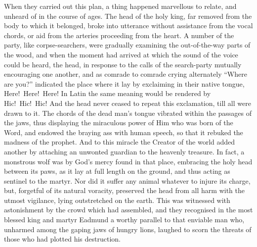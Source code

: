\documentclass[10pt]{book}
\begin{document}
\begin{paracol}{2}
When they carried out this plan, a thing happened marvellous to relate, and unheard of in the course of ages. The head of the holy king, far removed from the body to which it belonged, broke into utterance without assistance from the vocal chords, or aid from the arteries proceeding from the heart. A number of the party, like corpse-searchers, were gradually examining the out-of-the-way parts of the wood, and when the moment had arrived at which the sound of the voice could be heard, the head, in response to the calls of the search-party mutually encouraging one another, and as comrade to comrade crying alternately ``Where are you?'' indicated the place where it lay by exclaiming in their native tongue, Here!\ Here!\ Here! In Latin the same meaning would be rendered by Hic!\ Hic!\ Hic! And the head never ceased to repeat this exclamation, till all were drawn to it. The chords of the dead man's tongue vibrated within the passages of the jaws, thus displaying the miraculous power of Him who was born of the Word, and endowed the braying ass with human speech, so that it rebuked the madness of the prophet. And to this miracle the Creator of the world added another by attaching an unwonted guardian to the heavenly treasure. In fact, a monstrous wolf was by God's mercy found in that place, embracing the holy head between its paws, as it lay at full length on the ground, and thus acting as sentinel to the martyr. Nor did it suffer any animal whatever to injure its charge, but, forgetful of its natural voracity, preserved the head from all harm with the utmost vigilance, lying outstretched on the earth. This was witnessed with astonishment by the crowd which had assembled, and they recognised in the most blessed king and martyr Eadmund a worthy parallel to that enviable man who, unharmed among the gaping jaws of hungry lions, laughed to scorn the threats of those who had plotted his destruction.

\switchcolumn*


\end{paracol}
\end{document}

